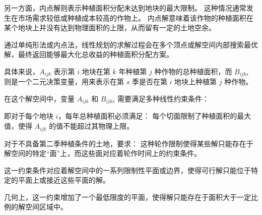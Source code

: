 \documentclass[12pt,a4paper]{nmmcm}
\begin{document}
另一方面，内点解则表示种植面积分配未达到地块的最大限制。
这种情况通常发生在市场需求较低或种植成本较高的作物上。
内点解意味着该作物的种植面积在某个地块上并没有达到物理面积的上限，从而留有一定的土地空余。


通过单纯形法或内点法，线性规划的求解过程会在多个顶点或解空间内部搜索最优解，最终返回能够最大化总收益的种植面积分配方案。




具体来说，$A_{ijk}$ 表示第 $i$ 地块在第 $k$ 年种植第 $j$ 种作物的总种植面积，而 $B_{ijks}$ 则是一个二元决策变量，用来表示在第 $s$ 季是否在第 $i$ 地块上种植第 $j$ 种作物。


在这个解空间中，变量 $A_{ijk}$ 和 $B_{ijks}$ 需要满足多种线性约束条件：

即对于每个地块 $i$，每年总种植面积必须满足：
每个切面限制了种植面积的最大值，使得 $A_{ijk}$ 的值不能超过其物理上限。


对于不具备第二季种植条件的土地，要求：
这种轮作限制使得某些解只能存在于解空间的特定“面”上，而这些面对应着轮作时间上的约束条件。


这一约束条件对应着解空间中的一系列限制性平面或边界，使得可行解只能位于特定的平面上或接近这些平面的解。


几何上，这一约束增加了一个最低限度的平面，使得解只能存在于面积大于一定比例的解空间区域中。
\end{document}
